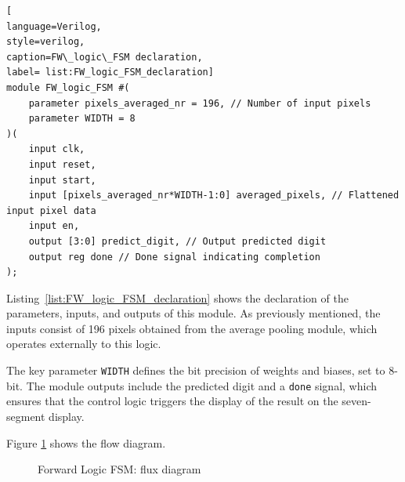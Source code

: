 \documentclass[11pt]{report}
\begin{document}
\begin{lstlisting}[
language=Verilog,
style=verilog,
caption=FW\_logic\_FSM declaration,
label= list:FW_logic_FSM_declaration]
module FW_logic_FSM #(
    parameter pixels_averaged_nr = 196, // Number of input pixels
    parameter WIDTH = 8
)( 
    input clk,
    input reset,
    input start,
    input [pixels_averaged_nr*WIDTH-1:0] averaged_pixels, // Flattened input pixel data
    input en,
    output [3:0] predict_digit, // Output predicted digit
    output reg done // Done signal indicating completion
);
\end{lstlisting}

Listing~\ref{list:FW_logic_FSM_declaration} shows the declaration of the parameters, inputs, and outputs of this module. As previously mentioned, the inputs consist of 196 pixels obtained from the average pooling module, which operates externally to this logic.  

The key parameter \texttt{WIDTH} defines the bit precision of weights and biases, set to 8-bit. The module outputs include the predicted digit and a \texttt{done} signal, which ensures that the control logic triggers the display of the result on the seven-segment display.

Figure \ref{fig:FW_logic_FSM} shows the flow diagram.

\begin{figure}[!ht]
\centering
{}
\caption{Forward Logic FSM: flux diagram}
\label{fig:FW_logic_FSM}
\end{figure}
\end{document}
